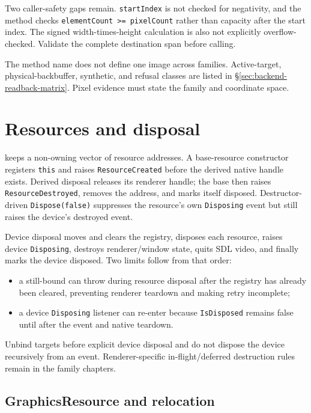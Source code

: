 Two caller-safety gaps remain. \texttt{startIndex} is not checked for negativity, and the method
checks \texttt{elementCount >= pixelCount} rather than capacity after the start index. The
signed width-times-height calculation is also not explicitly overflow-checked. Validate the
complete destination span before calling.

The method name does not define one image across families. Active-target, physical-backbuffer,
synthetic, and refusal classes are listed in \S\ref{sec:backend-readback-matrix}. Pixel evidence
must state the family and coordinate space.

\section{Resources and disposal}
\label{sec:resource-lifetime}

 keeps a non-owning vector of resource addresses. A base-resource
constructor registers \texttt{this} and raises \texttt{ResourceCreated} before the derived native
handle exists. Derived disposal releases its renderer handle; the base then raises
\texttt{ResourceDestroyed}, removes the address, and marks itself disposed. Destructor-driven
\texttt{Dispose(false)} suppresses the resource's own \texttt{Disposing} event but still raises
the device's destroyed event.

Device disposal moves and clears the registry, disposes each resource, raises device
\texttt{Disposing}, destroys renderer/window state, quits SDL video, and finally marks the device
disposed. Two limits follow from that order:

\begin{itemize}
  \item a still-bound  can throw during resource disposal after the
        registry has already been cleared, preventing renderer teardown and making retry
        incomplete;
  \item a device \texttt{Disposing} listener can re-enter because \texttt{IsDisposed} remains
        false until after the event and native teardown.
\end{itemize}

Unbind targets before explicit device disposal and do not dispose the device recursively from an
event. Renderer-specific in-flight/deferred destruction rules remain in the family chapters.

\subsection{GraphicsResource and relocation}


